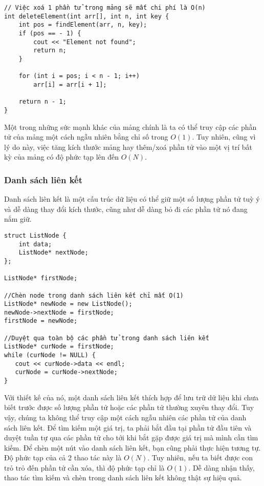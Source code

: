 \documentclass{article}
\begin{document}
\begin{verbatim}
// Việc xoá 1 phần tử trong mảng sẽ mất chi phí là O(n)
int deleteElement(int arr[], int n, int key {
    int pos = findElement(arr, n, key);
    if (pos == - 1) {
        cout << "Element not found";
        return n;
    }
 
    for (int i = pos; i < n - 1; i++)
        arr[i] = arr[i + 1];
 
    return n - 1;
}
\end{verbatim}

Một trong những sức mạnh khác của mảng chính là ta có thể truy cập các phần tử của mảng một cách ngẫu nhiên bằng chỉ số trong $O(1)$. Tuy nhiên, cũng vì lý do này, việc tăng kích thước mảng hay thêm/xoá phần tử vào một vị trí bất kỳ của mảng có độ phức tạp lên đến $O(N)$.

\subsubsection{Danh sách liên kết}
Danh sách liên kết là một cấu trúc dữ liệu có thể giữ một số lượng phần tử tuỳ ý và dễ dàng thay đổi kích thước, cũng như dễ dàng bỏ đi các phần tử nó đang nắm giữ.\\

\begin{verbatim}
struct ListNode {
    int data; 
    ListNode* nextNode;
};

ListNode* firstNode;

//Chèn node trong danh sách liên kết chỉ mất O(1)
ListNode* newNode = new ListNode();
newNode->nextNode = firstNode;
firstNode = newNode;

//Duyệt qua toàn bộ các phần tử trong danh sách liên kết
ListNode* curNode = firstNode;
while (curNode != NULL) {
   cout << curNode->data << endl;
   curNode = curNode->nextNode;
}
\end{verbatim}

Với thiết kế của nó, một danh sách liên kết thích hợp để lưu trữ dữ liệu khi chưa biết trước được số lượng phần tử hoặc các phần tử thường xuyên thay đổi. Tuy vậy, chúng ta không thể truy cập một cách ngẫu nhiên các phần tử của danh sách liên kết. Để tìm kiếm một giá trị, ta phải bắt đầu tại phần tử đầu tiên và duyệt tuần tự qua các phần tử cho tới khi bắt gặp được giá trị mà mình cần tìm kiếm. Để chèn một nút vào danh sách liên kết, bạn cũng phải thực hiện tương tự. Độ phức tạp của cả 2 thao tác này là $O(N)$. Tuy nhiên, nếu ta biết được con trỏ trỏ đến phần tử cần xóa, thì độ phức tạp chỉ là $O(1)$. Dễ dàng nhận thấy, thao tác tìm kiếm và chèn trong danh sách liên kết không thật sự hiệu quả.\\
\end{document}
